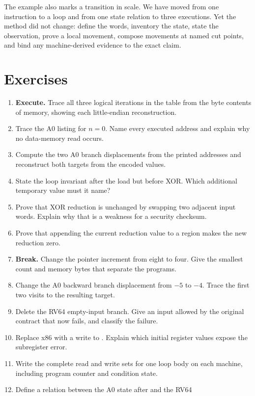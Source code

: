 The example also marks a transition in scale. We have moved from one
instruction to a loop and from one state relation to three executions. Yet the
method did not change: define the words, inventory the state, state the
observation, prove a local movement, compose movements at named cut points,
and bind any machine-derived evidence to the exact claim.

\section{Exercises}

\begin{enumerate}
\item \textbf{Execute.} Trace all three logical iterations in the table from
the byte contents of memory, showing each little-endian reconstruction.
\item Trace the A0 listing for \(n=0\). Name every executed address and explain
why no data-memory read occurs.
\item Compute the two A0 branch displacements from the printed addresses and
reconstruct both targets from the encoded values.
\item State the loop invariant after the load but before XOR. Which additional
temporary value must it name?
\item Prove that XOR reduction is unchanged by swapping two adjacent input
words. Explain why that is a weakness for a security checksum.
\item Prove that appending the current reduction value to a region makes the
new reduction zero.
\item \textbf{Break.} Change the pointer increment from eight to four. Give the
smallest count and memory bytes that separate the programs.
\item Change the A0 backward branch displacement from \(-5\) to \(-4\). Trace
the first two visits to the resulting target.
\item Delete the RV64 empty-input branch. Give an input allowed by the original
contract that now fails, and classify the failure.
\item Replace x86  with a write to . Explain which
initial register values expose the subregister error.
\item Write the complete read and write sets for one loop body on each machine,
including program counter and condition state.
\item Define a relation between the A0 state after  and the RV64

\end{enumerate}
